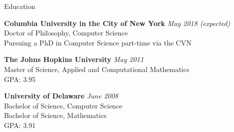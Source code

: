 \documentclass{resume} %
\begin{document}

\begin{rSection}{Education}

{\bf Columbia University in the City of New York} \hfill {\em May 2018 (expected)} \\ 
Doctor of Philosophy, Computer Science \\
Pursuing a PhD in Computer Science part-time via the CVN

{\bf The Johns Hopkins University} \hfill {\em May 2011} \\
Master of Science, Applied and Computational Mathematics \\
GPA: 3.95

{\bf University of Delaware} \hfill {\em June 2008} \\
Bachelor of Science, Computer Science \\
Bachelor of Science, Mathematics \\
GPA: 3.91


\end{rSection}

\end{document}
